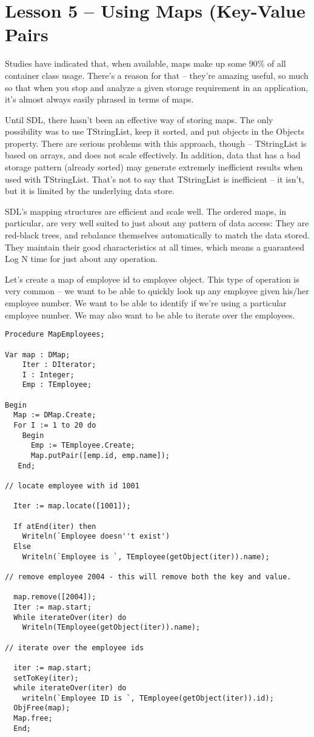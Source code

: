\documentclass{report}
\begin{document}
\section{Lesson 5 -- Using Maps (Key-Value Pairs}

Studies have indicated that, when available, maps make up some 90\% of all
container class usage. There's a reason for that -- they're amazing useful,
so much so that when you stop and analyze a given storage requirement in an
application, it's almost always easily phrased in terms of maps.

Until SDL, there hasn't been an effective way of storing maps.  The only
possibility was to use TStringList, keep it sorted, and put objects in the
Objects property. There are serious problems with this approach, though --
TStringList is based on arrays, and does not scale effectively. In addition,
data that has a bad storage pattern (already sorted) may generate extremely
inefficient results when used with TStringList. That's not to say that
TStringList is inefficient -- it isn't, but it is limited by the underlying
data store.

SDL's mapping structures are efficient and scale well. The ordered maps, in
particular, are very well suited to just about any pattern of data access:
They are red-black trees, and rebalance themselves automatically to match
the data stored.  They maintain their good characteristics at all times,
which means a guaranteed Log N time for just about any operation.

Let's create a map of employee id to employee object. This type of operation
is very common -- we want to be able to quickly look up any employee given
his/her employee number. We want to be able to identify if we're using a
particular employee number. We may also want to be able to iterate over the
employees.

\begin{lstlisting}
Procedure MapEmployees;

Var map : DMap;
    Iter : DIterator;
    I : Integer;
    Emp : TEmployee;

Begin
  Map := DMap.Create;
  For I := 1 to 20 do
    Begin
      Emp := TEmployee.Create;
      Map.putPair([emp.id, emp.name]);
   End;

// locate employee with id 1001

  Iter := map.locate([1001]);

  If atEnd(iter) then
    Writeln(`Employee doesn''t exist')
  Else
    Writeln(`Employee is `, TEmployee(getObject(iter)).name);

// remove employee 2004 - this will remove both the key and value.

  map.remove([2004]);
  Iter := map.start;
  While iterateOver(iter) do
    Writeln(TEmployee(getObject(iter)).name);

// iterate over the employee ids

  iter := map.start;
  setToKey(iter);
  while iterateOver(iter) do
    writeln(`Employee ID is `, TEmployee(getObject(iter)).id);
  ObjFree(map);
  Map.free;
  End;
\end{lstlisting}
\end{document}
